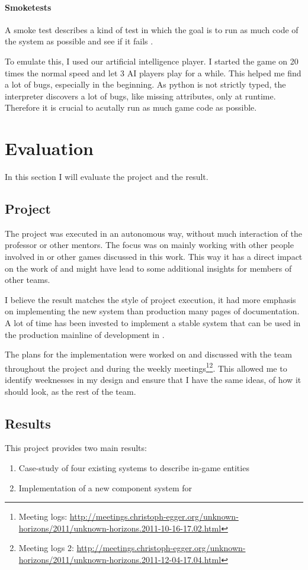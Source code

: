 \paragraph{Smoketests}
A smoke test describes a kind of test in which the goal is to run as much code of the system as possible and see if it
fails \cite{Mcconnell:1996:DBS:624614.625626}.

To emulate this, I used our artificial intelligence player. I started the game on 20 times the normal speed and
let 3 AI players play for a while. This helped me find a lot of bugs, especially in the beginning. As python is not
strictly typed, the interpreter discovers a lot of bugs, like missing attributes, only at runtime. Therefore it is
crucial to acutally run as much game code as possible.

\section{Evaluation}
In this section I will evaluate the project and the result.

\subsection{Project}
The project was executed in an autonomous way, without much interaction of the professor or other mentors. The focus was
on mainly working with other people involved in \UH{} or other \OS{} games discussed in this work. This way it has a
direct impact on the work of \UH{} and might have lead to some additional insights for members of other teams.

I believe the result matches the style of project execution, it had more emphasis on implementing the new
system than production many pages of documentation. A lot of time has been invested to implement a stable system that can be used in the
production mainline of development in \UH{}.

The plans for the implementation were worked on and discussed with the \UH{} team throughout the project and during the
weekly meetings\footnote{Meeting logs:
\url{http://meetings.christoph-egger.org/unknown-horizons/2011/unknown-horizons.2011-10-16-17.02.html}}\footnote{Meeting
logs 2: \url{http://meetings.christoph-egger.org/unknown-horizons/2011/unknown-horizons.2011-12-04-17.04.html}}. This
allowed me to identify weeknesses in my design and ensure that I have the same ideas, of how it should look, as the rest
of the team.

\subsection{Results}
This project provides two main results:
\begin{enumerate}
    \item Case-study of four existing systems to describe in-game entities
    \item Implementation of a new component system for \UH
\end{enumerate}

